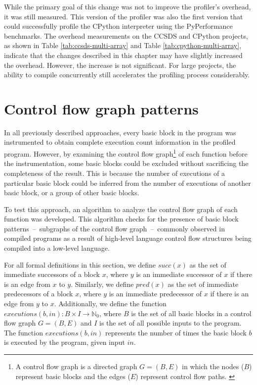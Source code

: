While the primary goal of this change was not to improve the profiler's overhead, it was still measured. This version of the profiler was also the first version that could successfully profile the CPython interpreter using the PyPerformance benchmarks. The overhead measurements on the CCSDS and CPython projects, as shown in Table \ref{tab:ccsds-multi-array} and Table \ref{tab:cpython-multi-array}, indicate that the changes described in this chapter may have slightly increased the overhead. However, the increase is not significant. For large projects, the ability to compile concurrently still accelerates the profiling process considerably.


\section{Control flow graph patterns}
\label{patterns}

In all previously described approaches, every basic block in the program was instrumented to obtain complete execution count information in the profiled program. However, by examining the control flow graph\footnote{A control flow graph is a directed graph $G = (B, E)$ in which the nodes ($B$) represent basic blocks and the edges ($E$) represent control flow paths. \cite{cfg-paper}} of each function before the instrumentation, some basic blocks could be excluded without sacrificing the completeness of the result. This is because the number of executions of a particular basic block could be inferred from the number of executions of another basic block, or a group of other basic blocks.

To test this approach, an algorithm to analyze the control flow graph of each function was developed. This algorithm checks for the presence of basic block patterns \,--\, subgraphs of the control flow graph \,--\, commonly observed in compiled programs as a result of high-level language control flow structures being compiled into a low-level language. 

For all formal definitions in this section, we define \(succ(x)\) as the set of immediate successors of a block \( x \), where \( y \) is an immediate successor of \( x \) if there is an edge from \( x \) to \( y \). Similarly, we define \(pred(x)\) as the set of immediate predecessors of a block \( x \), where \( y \) is an immediate predecessor of \( x \) if there is an edge from \( y \) to \( x \). Additionally, we define the function \(executions(b, in) : B \times I \to \mathbb{N}_0\), where \(B\) is the set of all basic blocks in a control flow graph \(G = (B, E)\) and \(I\) is the set of all possible inputs to the program. The function \(executions(b, in)\) represents the number of times the basic block \(b\) is executed by the program, given input \(in\).



